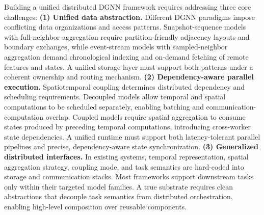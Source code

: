 Building a unified distributed DGNN framework requires addressing three core challenges:
%
\textbf{(1) Unified data abstraction.} 
Different DGNN paradigms impose conflicting data organizations and access patterns. 
Snapshot-sequence models with full-neighbor aggregation require partition-friendly adjacency layouts and boundary exchanges, while event-stream models with sampled-neighbor aggregation demand chronological indexing and on-demand fetching of remote features and states. 
A unified storage layer must support both patterns under a coherent ownership and routing mechanism.
%
\textbf{(2) Dependency-aware parallel execution.} 
Spatiotemporal coupling determines distributed dependency and scheduling requirements.
Decoupled models allow temporal and spatial computations to be scheduled separately, enabling batching and communication-computation overlap. 
Coupled models require spatial aggregation to consume states produced by preceding temporal computations, introducing cross-worker state dependencies. 
A unified runtime must support both latency-tolerant parallel pipelines and precise, dependency-aware state synchronization.
%
\textbf{(3) Generalized distributed interfaces.} 
In existing systems, temporal representation, spatial aggregation strategy, coupling mode, and task semantics are hard-coded into storage and communication stacks. 
Most frameworks support downstream tasks only within their targeted model families. 
A true substrate requires clean abstractions that decouple task semantics from distributed orchestration, enabling high-level composition over reusable components.

